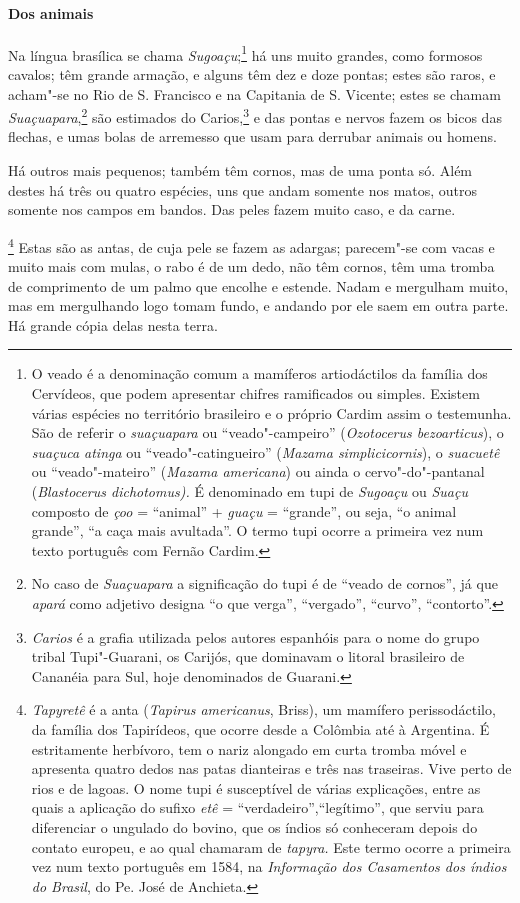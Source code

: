 \begin{linenumbers}
\paragraph{Dos animais}\quad
{} Na língua brasílica se chama \textit{Sugoaçu};\footnote{ O veado 
é a denominação comum a mamíferos artiodáctilos
da família dos Cervídeos, que podem apresentar chifres ramificados ou
simples. Existem várias espécies no território brasileiro e o próprio
Cardim assim o testemunha. São de referir o \textit{suaçuapara} ou
``veado"-campeiro'' (\textit{Ozotocerus bezoarticus}), o \textit{suaçuca
atinga} ou ``veado"-catingueiro'' (\textit{Mazama simplicicornis}), o
\textit{suacuetê} ou ``veado"-mateiro'' (\textit{Mazama americana}) ou
ainda o cervo"-do"-pantanal (\textit{Blastocerus dichotomus).} É
denominado em tupi de \textit{Sugoaçu} ou \textit{Suaçu} composto de
\textit{çoo} = ``animal'' + \textit{guaçu} = ``grande'', ou seja, ``o animal
grande'', ``a caça mais avultada''. O termo tupi ocorre a primeira vez num
texto português com Fernão Cardim.} há uns muito grandes,
como formosos cavalos; têm grande armação, e alguns têm dez e doze
pontas; estes são raros, e acham"-se no Rio de S. Francisco e na
Capitania de S. Vicente; estes se chamam \textit{Suaçuapara},\footnote{ No caso de 
\textit{Suaçuapara} a significação do tupi é
de ``veado de cornos'', já que \textit{apará} como adjetivo designa ``o
que verga'', ``vergado'', ``curvo'', ``contorto''.} são
estimados do Carios,\footnote{ \textit{Carios} é a grafia
utilizada pelos autores espanhóis para o nome do grupo tribal
Tupi"-Guarani, os Carijós, que dominavam o litoral brasileiro de
Cananéia para Sul, hoje denominados de Guarani.} e das pontas e nervos
fazem os bicos das flechas, e umas bolas de arremesso que usam para
derrubar animais ou homens.

Há outros mais pequenos; também têm cornos, mas de uma ponta só. Além
destes há três ou quatro espécies, uns que andam somente nos matos,
outros somente nos campos em bandos. Das peles fazem muito caso, e da carne. 

\footnote{ \textit{Tapyretê} é a anta
(\textit{Tapirus americanus}, Briss), um mamífero
perissodáctilo, da família dos Tapirídeos, que ocorre desde a Colômbia
até à Argentina. É estritamente herbívoro, tem o nariz alongado em
curta tromba móvel e apresenta quatro dedos nas patas dianteiras e três
nas traseiras. Vive perto de rios e de lagoas. O nome tupi é
susceptível de várias explicações, entre as quais a aplicação do sufixo
\textit{etê} = ``verdadeiro'',``legítimo'', que serviu para diferenciar o
ungulado do bovino, que os índios só conheceram depois do contato
europeu, e ao qual chamaram de \textit{tapyra.} Este termo ocorre a
primeira vez num texto português em 1584, na \textit{Informação dos
Casamentos dos índios do Brasil}, do Pe. José de Anchieta.} 
Estas são as antas, de cuja pele se fazem as adargas; parecem"-se com
vacas e muito mais com mulas, o rabo é de um dedo, não têm cornos, têm
uma tromba de comprimento de um palmo que encolhe e estende. Nadam e
mergulham muito, mas em mergulhando logo tomam fundo, e andando por ele
saem em outra parte. Há grande cópia delas nesta terra.


\end{linenumbers}

